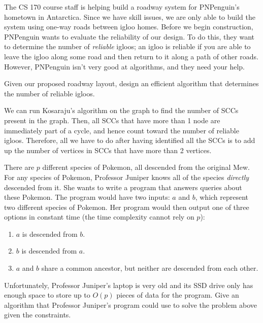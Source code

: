 \documentclass[10.5pt]{article}
\begin{document}
\begin{subparts}

    \item The CS 170 course staff is helping build a roadway system for PNPenguin's hometown in Antarctica. Since we have skill issues, we are only able to build the system using one-way roads between igloo homes. Before we begin construction, PNPenguin wants to evaluate the reliability of our design. To do this, they want to determine the number of \textit{reliable} igloos; an igloo is reliable if you are able to leave the igloo along some road and then return to it along a path of other roads.
      However, PNPenguin isn't very good at algorithms, and they need your help.

    Given our proposed roadway layout, design an efficient algorithm that determines the number of reliable igloos.

	\begin{solution}
		We can run Kosaraju's algorithm on the graph to find the number of SCCs present in the graph. Then,
		all SCCs that have more than 1 node are immediately part of a cycle, and hence count toward the number of
		reliable igloos. Therefore, all we have to do after having identified all the SCCs is to add up 
		the number of vertices in SCCs that have more than 2 vertices.
	\end{solution}
    \subpart There are $p$ different species of Pokemon, all descended from the original Mew. For any species of Pokemon, Professor Juniper knows all of the species \textit{directly} descended from it. She wants to write a program that answers queries about these Pokemon. The program would have two inputs: $a$ and $b$, which represent two different species of Pokemon. Her program would then output one of three options in constant time (the time complexity cannot rely on $p$): 
    \begin{enumerate}[(1)]
        \item $a$ is descended from $b$.
        \item $b$ is descended from $a$.
        \item $a$ and $b$ share a common ancestor, but neither are descended from each other.
    \end{enumerate}
    Unfortunately, Professor Juniper's laptop is very old and its SSD drive only has enough space to store up to $O(p)$ pieces of data for the program. Give an algorithm that Professor Juniper's program could use to solve the problem above given the constraints. 
    

\end{subparts}
\end{document}
